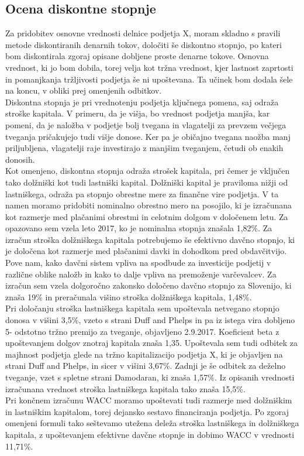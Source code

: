 \documentclass[12pt,a4paper]{amsart}
\theoremstyle{definition} %
\theoremstyle{plain} %
\begin{document}
\subsection{Ocena diskontne stopnje}
Za pridobitev osnovne vrednosti delnice podjetja X, moram skladno s pravili metode diskontiranih denarnih tokov, določiti še diskontno stopnjo, po kateri bom diskontirala zgoraj opisane dobljene proste denarne tokove. Osnovna vrednost, ki jo bom dobila, torej velja kot tržna vrednost, kjer lastnost zaprtosti in pomanjkanja tržljivosti podjetja še ni upoštevana. Ta učinek bom dodala šele na koncu, v obliki prej omenjenih odbitkov. \\
Diskontna stopnja je pri vrednotenju podjetja ključnega pomena, saj odraža stroške kapitala. V primeru, da je višja, bo vrednost podjetja manjša, kar pomeni, da je naložba v podjetje bolj tvegana in vlagatelji za prevzem večjega tveganja pričakujejo tudi višje donose. Ker pa je običajno tvegana naožba manj priljubljena, vlagatelji raje investirajo z manjšim tveganjem, četudi ob enakih donosih.\\
Kot omenjeno, diskontna stopnja odraža strošek kapitala, pri čemer je vključen tako dolžniški kot tudi lastniški kapital. Dolžniški kapital je praviloma nižji od lastniškega, odraža pa stopnjo obrestne mere za finančne vire podjetja. V ta namen moramo pridobiti nominalno obrestno mero na posojilo, ki je izračunana kot razmerje med plačanimi obrestmi in celotnim dolgom v določenem letu. Za opazovano sem vzela leto 
2017, ko je nominalna stopnja znašala 1,82\%.  Za izračun stroška dolžniškega kapitala potrebujemo še efektivno davčno stopnjo, ki je določena kot razmerje med plačanimi davki in dohodkom pred obdavčitvijo. Pove nam, kako davčni sistem vpliva na spodbude za investicije podjetij v različne oblike naložb in kako to dalje vpliva na premoženje varčevalcev. Za izračun sem vzela dolgoročno zakonsko določeno davčno stopnjo za Slovenijo, ki znaša 19\% in preračunala višino stroška dolžniškega kapitala, 1,48\%.\\
Pri določanju stroška lastniškega kapitala sem upoštevala netvegano stopnjo donosa v višini 3,5\%, vzeto s strani Duff and Phelps in pa iz istega vira dobljeno 5- odstotno tržno premijo za tveganje, objavljeno 2.9.2017. Koeficient beta z upoštevanjem dolgov znotraj kapitala znaša 1,35. Upoštevala sem tudi odbitek za majhnost podjetja glede na tržno kapitalizacijo podjetja X, ki je objavljen na strani Duff and Phelps, in sicer v višini 3,67\%. Zadnji je še odbitek za deželno tveganje, vzet s spletne strani Damodaran, ki znaša 1,57\%. Iz opisanih vrednosti izračunana vrednost stroška lastniškega kapitala tako znaša 15,5\%.\\
Pri končnem izračunu WACC moramo upoštevati tudi razmerje med dolžniškim in lastniškim kapitalom, torej dejansko sestavo financiranja podjetja. Po zgoraj omenjeni formuli tako seštevamo utežena deleža stroška lastniškega in dolžniškega kapitala, z upoštevanjem efektivne davčne stopnje in dobimo WACC v vrednosti 11,71\%.
  
\end{document}
